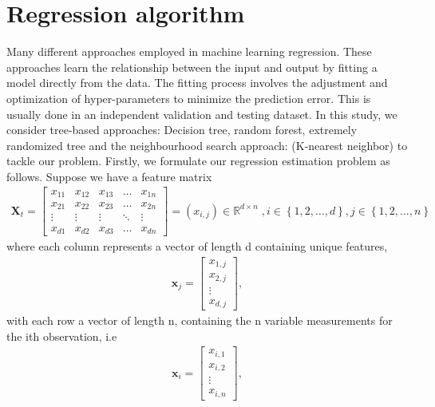 \section{Regression algorithm} 
\label{algo1}
Many different approaches employed in machine learning regression. These approaches learn the relationship between the input and output by fitting a model directly from the data. The fitting process involves the adjustment and optimization of hyper-parameters to minimize the prediction error. This is usually done in an independent validation and testing dataset. In this study, we consider tree-based approaches: Decision tree, random forest, extremely randomized tree and the neighbourhood search approach: (K-nearest neighbor) to tackle our problem. Firstly, we formulate our regression estimation problem as follows. Suppose we have a feature matrix 
\begin{align*}
\textbf{X}_{t}=\begin{bmatrix}
    x_{11} & x_{12} & x_{13} & \dots  & x_{1n} \\
    x_{21} & x_{22} & x_{23} & \dots  & x_{2n} \\
    \vdots & \vdots & \vdots & \ddots & \vdots \\
    x_{d1} & x_{d2} & x_{d3} & \dots  & x_{dn}
\end{bmatrix}=(x_{i,j}) \in  \mathbb{R}^{d \times n}\;, i\in \left\{1,2,\dots, d\right\}, j \in \left\{1,2,\dots,n\right\}
\end{align*}
where each column represents a vector of length d containing unique features, 
\begin{align*}
\textbf{x}_j=\begin{bmatrix}
    x_{1,j}  \\
    x_{2,j} \\
    \vdots \\
    x_{d,j} 
\end{bmatrix},
\end{align*}
with each row a vector of length n, containing the n variable measurements for the ith observation, i.e 
\begin{align*}
\textbf{x}_i=\begin{bmatrix}
    x_{i,1}  \\
    x_{i,2} \\
    \vdots \\
    x_{i,n} 
\end{bmatrix},
\end{align*}

